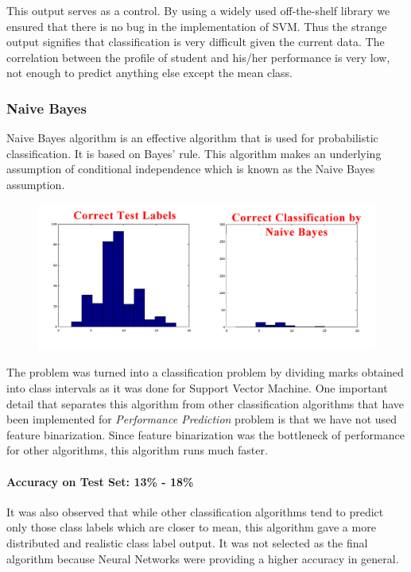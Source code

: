 \documentclass[12pt]{article}
\begin{document}
	This output serves as a control. By using a widely used off-the-shelf
	library we ensured that there is no bug in the implementation of SVM.
	Thus the strange output signifies that classification is very difficult
	given the current data. The correlation between the profile of student 
	and his/her performance is very low, not enough to predict anything else
	except the mean class.
	
	
	\subsubsection{Naive Bayes}
	Naive Bayes algorithm is an effective algorithm that is used for probabilistic
	classification. It is based on Bayes' rule. This algorithm makes an 
	underlying assumption of conditional independence which is known as the
	Naive Bayes assumption.\newline
	
	\begin{figure}[h]
	\includegraphics[width=\textwidth]{CorrectVsNaiveBayes}
	\end{figure}
	
	The problem was turned into a classification problem by dividing marks
	obtained into class intervals as it was done for Support Vector Machine.
	One important detail that separates this algorithm from other classification
	algorithms that have been implemented for \textit{Performance Prediction}
	problem is that we have not used feature binarization. Since feature binarization
	was the bottleneck of performance for other algorithms, this algorithm
	runs much faster.
	
	\paragraph{Accuracy on Test Set: 13\% - 18\%\newline}
	
	It was also observed that while other classification algorithms tend
	to predict only those class labels which are closer to mean, this
	algorithm gave a more distributed and realistic class label output.
	It was not selected as the final algorithm because Neural Networks
	were providing a higher accuracy in general.	
	
\end{document}
